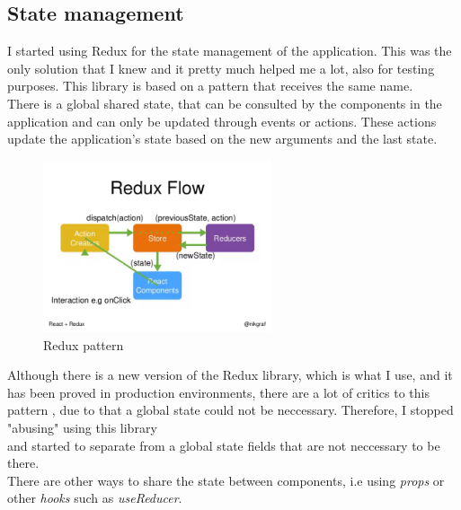     \subsection{State management}
        I started using Redux \cite{Redux} for the state management of the application. This was the only solution that I knew and it pretty much helped me a lot, also for testing purposes. This library is based on a pattern that receives the same name. \\
        There is a global shared state, that can be consulted by the components in the application and can only be updated through events or actions. These actions update the application's state based on the new arguments and the last state. \\
        \begin{figure}[H]
            \centering
                \includegraphics[width=0.6\textwidth]{assets/diagrams/redux.png}
            \caption{Redux pattern}
            \label{fig:Redux pattern}
        \end{figure}

        Although there is a new version of the Redux library, which is what I use, and it has been proved in production environments, there are a lot of critics to this pattern \cite{NoRedux}, due to that a global state could not be neccessary. Therefore, I stopped "abusing" using this library \\
        and started to separate from a global state fields that are not neccessary to be there. \\
        There are other ways to share the state between components, i.e using \textit{props} or other \textit{hooks} such as \textit{useReducer}. \\

